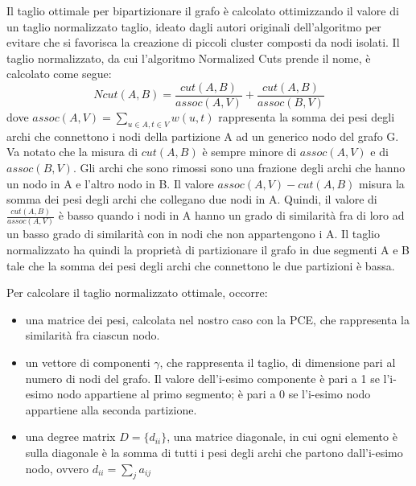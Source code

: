 Il taglio ottimale per bipartizionare il grafo è calcolato ottimizzando il valore di un taglio normalizzato taglio, ideato dagli autori originali dell'algoritmo per evitare che si favorisca la creazione di piccoli cluster composti da nodi isolati. Il taglio normalizzato, da cui l'algoritmo Normalized Cuts prende il nome, è calcolato come segue: 
$$ Ncut(A,B) =  \frac{cut(A,B)}{assoc(A,V)} + \frac{cut(A,B)}{assoc(B,V)} $$
dove $assoc(A,V) = \sum_{u\in A, t\in V} w(u,t) $ rappresenta la somma dei pesi degli archi che connettono i nodi della partizione A ad un generico nodo del grafo G.
Va notato che la misura di $cut(A,B)$ è sempre minore di $assoc(A,V)$ e di $assoc(B,V)$. Gli archi che sono rimossi sono una frazione degli archi che hanno un nodo in A e l'altro nodo in B. Il valore $assoc(A,V) - cut(A,B)$ misura la somma dei pesi degli archi che collegano due nodi in A. Quindi, il valore di $ \frac{cut(A,B)}{assoc(A,V)}$ è basso quando i nodi in A hanno un grado di similarità fra di loro ad un basso grado di similarità con in nodi che non appartengono i A. Il taglio normalizzato ha quindi la proprietà di partizionare il grafo in due segmenti A e B tale che la somma dei pesi degli archi che connettono le due partizioni è bassa.

Per calcolare il taglio normalizzato ottimale, occorre:
\begin{itemize}
\item una matrice dei pesi, calcolata nel nostro caso con la PCE, che rappresenta la similarità fra ciascun nodo.
\item un vettore di componenti $\gamma$, che rappresenta il taglio, di dimensione pari al numero di nodi del grafo. Il valore dell'i-esimo componente è pari a 1 se l'i-esimo nodo appartiene al primo segmento; è pari a 0 se l'i-esimo nodo appartiene alla seconda partizione.
\item una degree matrix $D = \lbrace d_{ii} \rbrace $, una matrice diagonale, in cui ogni elemento è sulla diagonale è la somma di tutti i pesi degli archi che partono dall'i-esimo nodo, ovvero $d_{ii} = \sum_{j} a_{ij}$
\end{itemize}


